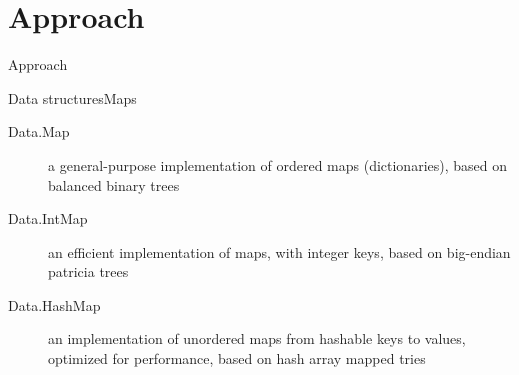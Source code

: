 
\section{Approach}



    \begin{frame}[plain]{}

        \begin{center}

        \huge Approach

        \end{center}

    \end{frame}



    \begin{frame}{Data structures}{Maps}

        \begin{description}

            \item [Data.Map] a general-purpose implementation of ordered maps (dictionaries), based on balanced binary trees

            \item [Data.IntMap] an efficient implementation of maps, with integer keys, based on big-endian patricia trees

            \item [Data.HashMap] an implementation of unordered maps from hashable keys to values, optimized for performance, based on hash array mapped tries


        \end{description}


    \end{frame}



